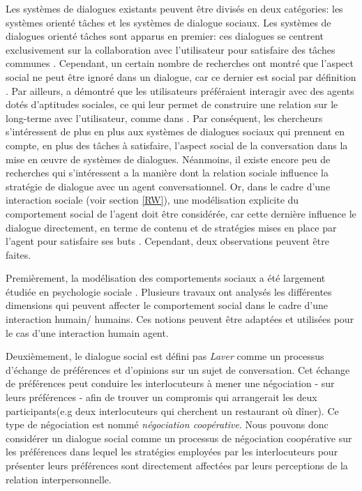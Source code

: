 \documentclass [french]{sig-alternate-05-2015}
\begin{document}
Les systèmes de dialogues existants peuvent être divisés en deux catégories: les systèmes orienté tâches et les systèmes de dialogue sociaux. Les systèmes de dialogues orienté tâches sont apparus en premier: ces dialogues se centrent exclusivement sur la collaboration avec l'utilisateur pour satisfaire des tâches communes \cite{allen1995spoken, allen1996robust}. Cependant, un certain nombre de recherches ont montré que l'aspect social ne peut être ignoré dans un dialogue, car ce dernier est social par définition \cite{markopoulos2005case}. Par ailleurs, \cite{moon1998intimate} a démontré que les utilisateurs préféraient interagir avec des agents dotés d'aptitudes sociales, ce qui leur permet de construire une relation sur le long-terme avec l'utilisateur, comme  dans \cite{bickmore2005establishing}. Par conséquent, les chercheurs s'intéressent de plus en plus aux systèmes de dialogues sociaux qui prennent en compte, en plus des tâches à satisfaire, l'aspect social de la conversation dans la mise en œuvre de systèmes de dialogues. Néanmoins, il existe encore peu de recherches qui s'intéressent a la manière dont la relation sociale influence la stratégie de dialogue avec un agent conversationnel. Or, dans le cadre d'une interaction  sociale (voir section \ref{RW}), une modélisation explicite du comportement social de l'agent doit être considérée, car cette dernière influence le dialogue directement, en terme de contenu et de stratégies mises en place par l'agent pour satisfaire ses buts \cite{bickmore2012empirical}. Cependant, deux observations peuvent être faites.

\par Premièrement, la modélisation des comportements sociaux a été largement étudiée en psychologie sociale \cite{dunbar2005perceptions, moon1998intimate}. Plusieurs travaux ont analysés les différentes dimensions qui peuvent affecter le comportement social dans le cadre d'une interaction humain/ humains. Ces notions peuvent être adaptées et utilisées pour le cas d'une interaction humain agent.

 \par Deuxièmement, le dialogue social est défini pas \emph{Laver}\cite{laver1981linguistic} comme un processus d'échange de préférences et d'opinions sur un sujet de conversation. Cet échange de préférences peut conduire les interlocuteurs à mener une négociation - sur leurs préférences - afin de trouver un compromis qui arrangerait les deux participants(e.g deux interlocuteurs qui cherchent un restaurant où dîner). Ce type de négociation est nommé \emph{négociation coopérative}. Nous pouvons donc considérer un dialogue social comme un processus de négociation coopérative sur les préférences dans lequel les stratégies employées par les interlocuteurs pour présenter leurs préférences sont directement affectées par leurs perceptions de la relation interpersonnelle.
\end{document}
